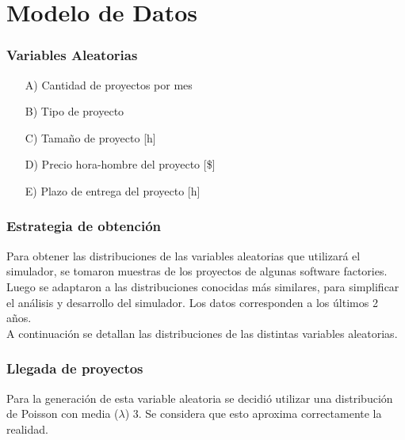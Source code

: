\part*{Modelo de Datos}

\section{Variables Aleatorias}

\begin{itemize}
    \item[A)] Cantidad de proyectos por mes
    \item[B)] Tipo de proyecto
    \item[C)] Tamaño de proyecto [h]
    \item[D)] Precio hora-hombre del proyecto [\$]
    \item[E)] Plazo de entrega del proyecto [h]
\end{itemize}

\section{Estrategia de obtención}

Para obtener las distribuciones de las variables aleatorias que utilizará el simulador, se tomaron muestras de los proyectos de algunas software factories. Luego se 
adaptaron a las distribuciones conocidas más similares, para simplificar el análisis y desarrollo del simulador. Los datos corresponden a los últimos 2 años. \\

A continuación se detallan las distribuciones de las distintas variables aleatorias.\\

\section*{Llegada de proyectos}
Para la generación de esta variable aleatoria se decidió utilizar una distribución de Poisson con media ($\lambda$) 3. Se considera que esto aproxima correctamente
la realidad. \\

